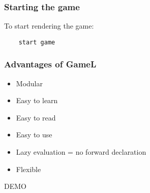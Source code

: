 \documentclass{beamer}
\begin{document}
\begin{frame}[fragile]
    \frametitle{Starting the game}
    To start rendering the game:
    \begin{lstlisting}
    start game
    \end{lstlisting}
\end{frame}

\begin{frame}
    \frametitle{Advantages of GameL}
    \begin{itemize}[<+->]
        \item{Modular}
        \item{Easy to learn}
        \item{Easy to read}
        \item{Easy to use}
        \item{Lazy evaluation = no forward declaration}
        \item{Flexible}
    \end{itemize}
\end{frame}

\begin{frame}[plain,c]
    \begin{center}
        \Huge DEMO
    \end{center}
\end{frame}
\end{document}
